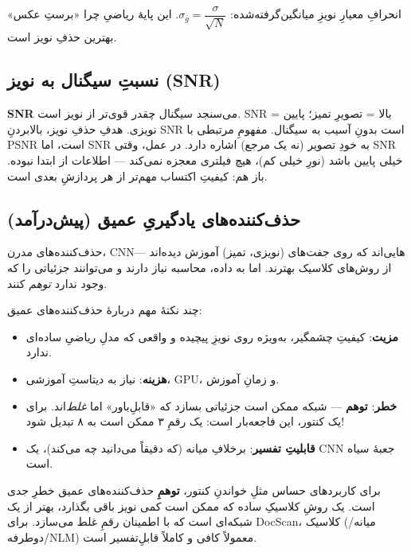 \documentclass[12pt,a4paper]{article}
\begin{document}
\begin{riyazi}
انحرافِ معیارِ نویزِ میانگین‌گرفته‌شده: $\sigma_{\bar{g}} = \dfrac{\sigma}{\sqrt{N}}$. این پایهٔ
ریاضیِ چرا «برستِ عکس» بهترین حذفِ نویز است.
\end{riyazi}

\subsection{نسبتِ سیگنال به نویز (SNR)}

\textbf{SNR} می‌سنجد سیگنال چقدر قوی‌تر از نویز است. SNRِ بالا = تصویرِ تمیز؛ پایین = نویزی. هدفِ
حذفِ نویز، بالابردنِ SNR است بدونِ آسیب به سیگنال. مفهومِ مرتبطی با PSNR است، اما SNR به خودِ
تصویر (نه یک مرجع) اشاره دارد. در عمل، وقتی SNR خیلی پایین باشد (نورِ خیلی کم)، هیچ فیلتری
معجزه نمی‌کند — اطلاعات از ابتدا نبوده. باز هم: کیفیتِ اکتساب مهم‌تر از هر پردازشِ بعدی است.

\subsection{حذف‌کننده‌های یادگیریِ عمیق (پیش‌درآمد)}

حذف‌کننده‌های مدرن، CNNهایی‌اند که روی جفت‌های (نویزی، تمیز) آموزش دیده‌اند — از روش‌های کلاسیک
بهترند. اما به داده، محاسبه نیاز دارند و می‌توانند جزئیاتی را که وجود ندارد \emph{توهم} کنند.

چند نکتهٔ مهم دربارهٔ حذف‌کننده‌های عمیق:

\begin{itemize}
  \item \textbf{مزیت}: کیفیتِ چشمگیر، به‌ویژه روی نویزِ پیچیده و واقعی که مدلِ ریاضیِ ساده‌ای ندارد.
  \item \textbf{هزینه}: نیاز به دیتاستِ آموزشی، GPU، و زمانِ آموزش.
  \item \textbf{خطر}: \textbf{توهم} — شبکه ممکن است جزئیاتی بسازد که «قابلِ‌باور» اما \emph{غلط}‌اند. برای یک کنتور، این فاجعه‌بار است: یک رقمِ ۳ ممکن است به ۸ تبدیل شود!
  \item \textbf{قابلیتِ تفسیر}: برخلافِ میانه (که دقیقاً می‌دانید چه می‌کند)، یک CNN جعبهٔ سیاه است.
\end{itemize}

\begin{hoshdar}
برای کاربردهای حساس مثلِ خواندنِ کنتور، \textbf{توهمِ} حذف‌کننده‌های عمیق خطرِ جدی است. یک روشِ
کلاسیکِ ساده که ممکن است کمی نویز باقی بگذارد، بهتر از یک شبکه‌ای است که با اطمینان رقمِ غلط
می‌سازد. برای DocScan، کلاسیک (میانه/دوطرفه/NLM) معمولاً کافی و کاملاً قابلِ‌تفسیر است.
\end{hoshdar}
\end{document}
